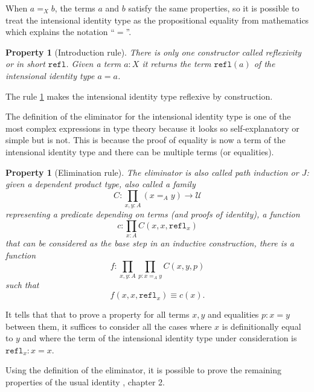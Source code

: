 \documentclass[12pt,a4paper,twoside,xetex]{book} %
\newcommand{\keyword}[1]{\emph{#1}\index{#1}}
\newtheorem{property}[theorem]{Property}
\newcommand{\op}[1]{\mathtt{#1}}
\begin{document}
When $a=_X b$, the terms $a$ and $b$ satisfy the  same properties, so it is possible to treat the intensional identity type as the propositional equality from mathematics which explains the notation ``$=$''. 

\begin{property}[Introduction rule]\label{reflprop}
There is only one constructor called \keyword{reflexivity} or in short 
$\op{refl}$. Given a term $a:X$ it returns the term $\op{refl}(a)$ of the 
intensional identity type  $a = a$. 
\end{property}

The rule \cref{reflprop} makes the intensional identity type reflexive by construction.

The definition of the eliminator for the intensional identity type is one of 
the most complex expressions in type theory because it looks so self-explanatory 
or simple but is not. This is because the proof of equality is now a term of 
the intensional identity type and there can be multiple terms (or equalities). 

\begin{property}[Elimination rule]\label{pathindprop}
The eliminator is also called \keyword{path 
induction} or $J$: given a dependent product type, also called a 
family
$$C : \prod_{x,y:A} (x =_A y) \rightarrow \mathcal{U}$$
representing a predicate depending on terms (and proofs of identity), a 
function $$c:\prod_{x:A} C(x,x,\op{refl}_x)$$ that can be considered as the base 
step in an inductive construction, there is a function $$f: \prod_{x,y:A} 
\prod_{p:x=_Ay}C(x,y,p)$$ such that $$f(x,x,\op{refl}_x) \equiv c(x).$$
\end{property}


It tells that that to prove a property for all terms $x,y$ and equalities 
$p:x=y$ between them, it suffices to consider all the cases where $x$ is 
definitionally equal to $y$ and where the term of the intensional identity type 
under consideration is $\op{refl}_x : x = x$.


 Using the 
definition of the eliminator, it is possible to prove the remaining properties 
of the usual identity \cite{Voevodsky2013}, chapter 2. 
\end{document}
